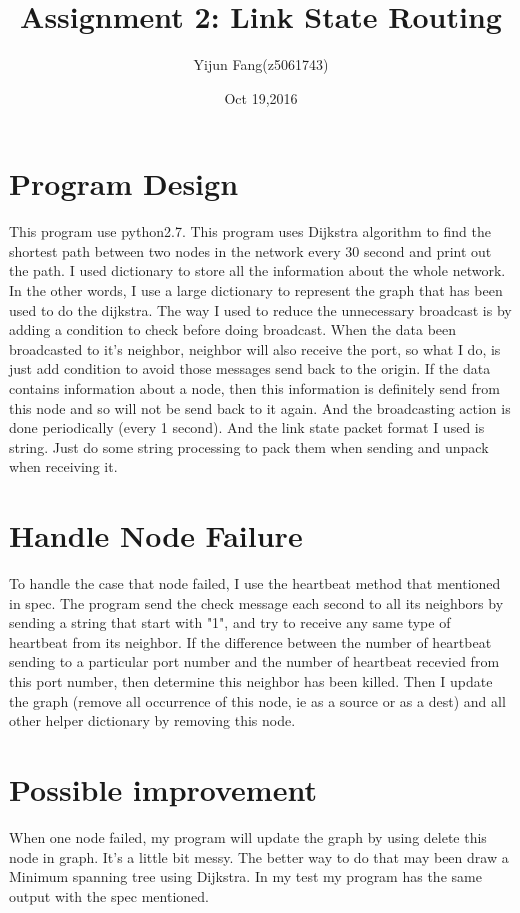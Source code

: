 \documentclass[a4paper]{scrartcl}
\title{Assignment 2: Link State Routing}
\author{Yijun Fang(z5061743)}
\date{Oct 19,2016}
\begin{document}
\maketitle
\section{Program Design}
This program use python2.7. This program uses Dijkstra algorithm to find the shortest path between two nodes in the network every 30 second and print out the path. I used dictionary to store all the information about the whole network. In the other words, I use a large dictionary to represent the graph that has been used to do the dijkstra. The way I used to reduce the unnecessary broadcast is by adding a condition to check before doing broadcast. When the data been broadcasted to it's neighbor, neighbor will also receive the port, so what I do, is just add condition to avoid those messages send back to the origin. If the data contains information about a node, then this information is definitely send from this node and so will not be send back to it again. And the broadcasting action is done periodically (every 1 second).  And the link state packet format I used is string. Just do some string processing to pack them when sending and unpack when receiving it. 
\section{Handle Node Failure}
To handle the case that node failed, I use the heartbeat method that mentioned in spec. The program send the check message each second to all its neighbors by sending a string that start with "1", and try to receive any same type of heartbeat from its neighbor. If the difference between the number of heartbeat sending to a particular port number and the number of heartbeat recevied from this port number, then determine this neighbor has been killed. Then I update the graph (remove all occurrence of this node, ie as a source or as a dest) and all other helper dictionary by removing this node. 
\section{Possible improvement}
When one node failed, my program will update the graph by using delete this node in graph. It's a little bit messy. The better way to do that may been draw a Minimum spanning tree using Dijkstra. In my test my program has the same output with the spec mentioned.
\end{document}
